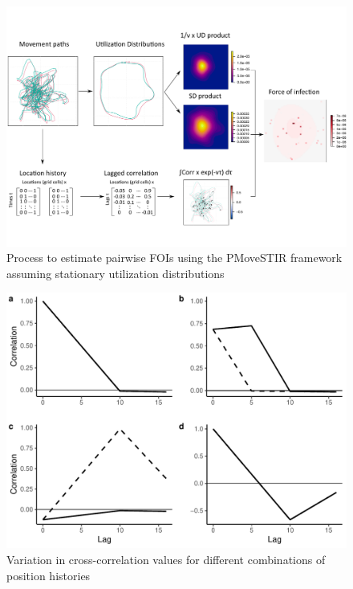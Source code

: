 \documentclass[letterpaper]{article}
\begin{document}
 \begin{figure}
     \includegraphics[width=\textwidth]{figures/steps_diagram.pdf}
     \caption{Process to estimate pairwise FOIs using the PMoveSTIR framework assuming stationary utilization distributions}
 	\label{fig:steps}
 \end{figure}

\begin{figure}
    \includegraphics[width=\textwidth]{figures/example_xcorrs.pdf}
    \caption{Variation in cross-correlation values for different combinations of position histories}
	\label{fig:xcorrs}
\end{figure}
\end{document}
